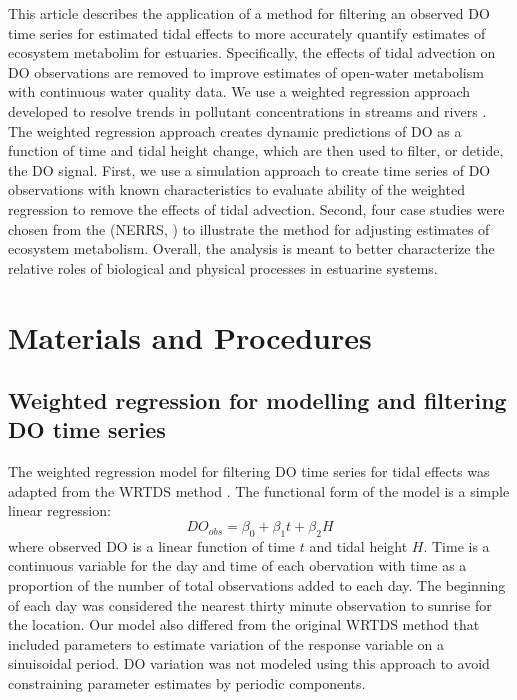 \documentclass[letterpaper,12pt,oneside]{article}\usepackage[]{graphicx}\usepackage[]{color}
\begin{document}
This article describes the application of a method for filtering an observed \ac{DO} time series for estimated tidal effects to more accurately quantify estimates of ecosystem metabolim for estuaries.  Specifically, the effects of tidal advection on \ac{DO} observations are removed to improve estimates of open-water metabolism with continuous water quality data.  We use a weighted regression approach developed to resolve trends in pollutant concentrations in streams and rivers \citep{Hirsch10}.  The weighted regression approach creates dynamic predictions of \ac{DO} as a function of time and tidal height change, which are then used to filter, or detide, the \ac{DO} signal.  First, we use a simulation approach to create time series of \ac{DO} observations with known characteristics to evaluate ability of the weighted regression to remove the effects of tidal advection.  Second, four case studies were chosen from the  (\acs{NERRS}, \citealt{Wenner04}) to illustrate the method for adjusting estimates of ecosystem metabolism.  Overall, the analysis is meant to better characterize the relative roles of biological and physical processes in estuarine systems.

\section{Materials and Procedures}

\subsection{Weighted regression for modelling and filtering \ac{DO} time series}

The weighted regression model for filtering \ac{DO} time series for tidal effects was adapted from the \ac{WRTDS} method \citep{Hirsch10}.  The functional form of the model is a simple linear regression:
\begin{equation}\label{funform}
DO_{obs}= \beta_0 + \beta_1 t + \beta_2 H
\end{equation}
where observed \ac{DO} is a linear function of time $t$ and tidal height $H$.  Time is a continuous variable for the day and time of each obervation with time as a proportion of the number of total observations added to each day.  The beginning of each day was considered the nearest thirty minute observation to sunrise for the location.  Our model also differed from the original \ac{WRTDS} method that included parameters to estimate variation of the response variable on a sinuisoidal period.  \ac{DO} variation was not modeled using this approach to avoid constraining parameter estimates by periodic components.
\end{document}
